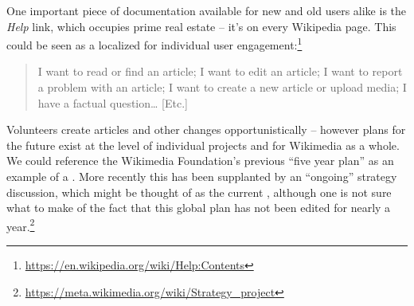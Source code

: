 One important piece of documentation available for new and old users
alike is the \emph{Help} link, which occupies prime real estate --
it's on every Wikipedia page.  This could be seen as a localized
 for individual user
engagement:\footnote{\url{https://en.wikipedia.org/wiki/Help:Contents}}

\begin{quotation}
\noindent 
I want to read or find an article;
I want to edit an article;
I want to report a problem with an article;
I want to create a new article or upload media;
I have a factual question\ldots
[Etc.]
\end{quotation}
%
%
%
%
Volunteers create articles and other changes opportunistically --
however plans for the future exist at the level of individual projects
and for Wikimedia as a whole.  We could reference the Wikimedia
Foundation's previous ``five year plan'' as an example of a
 \cite{wikimedia2011plan}.  More recently this
has been supplanted by an ``ongoing'' strategy discussion, which might
be thought of as the current , although one is
not sure what to make of the fact that this global plan has not been
edited for nearly a
year.\footnote{\url{https://meta.wikimedia.org/wiki/Strategy_project}}
%

